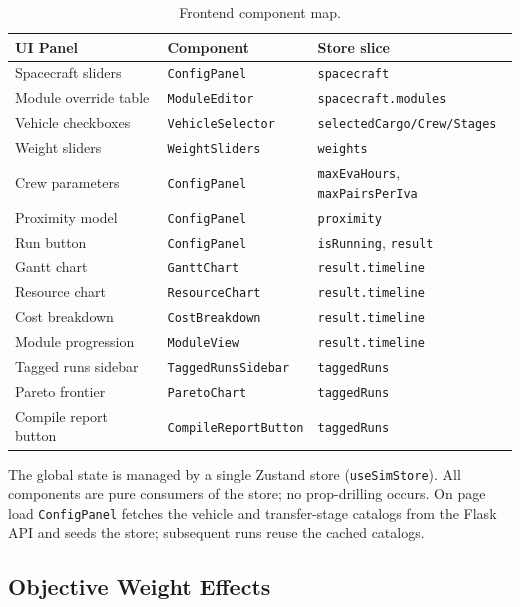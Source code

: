 \begin{table}[htbp]
\centering
\caption{Frontend component map.}
\label{tab:components}
\begin{tabular}{lll}
\toprule
UI Panel & Component & Store slice \\
\midrule
Spacecraft sliders    & \texttt{ConfigPanel}    & \texttt{spacecraft} \\
Module override table & \texttt{ModuleEditor}   & \texttt{spacecraft.modules} \\
Vehicle checkboxes    & \texttt{VehicleSelector}& \texttt{selectedCargo/Crew/Stages} \\
Weight sliders        & \texttt{WeightSliders}  & \texttt{weights} \\
Crew parameters       & \texttt{ConfigPanel}    & \texttt{maxEvaHours}, \texttt{maxPairsPerIva} \\
Proximity model       & \texttt{ConfigPanel}    & \texttt{proximity} \\
Run button            & \texttt{ConfigPanel}    & \texttt{isRunning}, \texttt{result} \\
Gantt chart           & \texttt{GanttChart}     & \texttt{result.timeline} \\
Resource chart        & \texttt{ResourceChart}  & \texttt{result.timeline} \\
Cost breakdown        & \texttt{CostBreakdown}  & \texttt{result.timeline} \\
Module progression    & \texttt{ModuleView}     & \texttt{result.timeline} \\
Tagged runs sidebar   & \texttt{TaggedRunsSidebar} & \texttt{taggedRuns} \\
Pareto frontier       & \texttt{ParetoChart}    & \texttt{taggedRuns} \\
Compile report button & \texttt{CompileReportButton} & \texttt{taggedRuns} \\
\bottomrule
\end{tabular}
\end{table}

\noindent The global state is managed by a single Zustand store
(\texttt{useSimStore}). All components are pure consumers of the
store; no prop-drilling occurs. On page load \texttt{ConfigPanel}
fetches the vehicle and transfer-stage catalogs from the Flask API
and seeds the store; subsequent runs reuse the cached catalogs.

\subsection{Objective Weight Effects}

